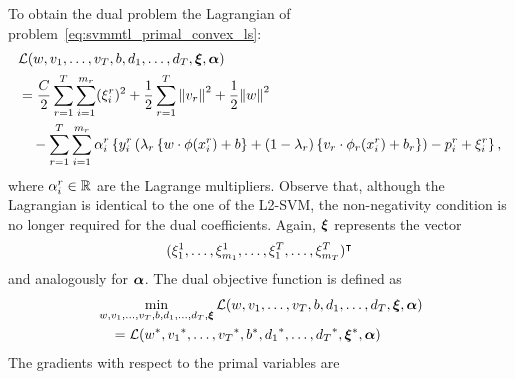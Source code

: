  To obtain the dual problem the Lagrangian of problem~\eqref{eq:svmmtl_primal_convex_ls}:
\begin{equation}\label{eq:svmmtl_lagrangian_convex_ls}
    \begin{aligned}
        & \lagr({w}, {v}_1, \ldots, {v}_\ntasks, b, d_1, \ldots, d_\ntasks, \fv{\xi}, \fv{\alpha}) \\
        &=  \frac{C}{2} \sum_{r= 1}^T \sum_{i=1}^{m_r} ({\xi_{i}^r})^2 + \frac{1}{2} \sum_{r= 1}^T{\norm{{v}_r}^2} + \frac{1}{2} {\norm{{w}}}^2 \\
        &\quad -  \sum_{r= 1}^T \sum_{i=1}^{m_r} \alpha_i^r \left\lbrace y_{i}^r  \left(\lambda_r \left\lbrace {w} \cdot \phi(x_{i}^r) + b  \right\rbrace + (1 - \lambda_r) \left\lbrace {v}_r \cdot \phi_r(x_{i}^r) + b_r \right\rbrace  \right) - p_{i}^r + \xi_{i}^r  \right\rbrace ,
    \end{aligned}
\end{equation}
where $\alpha_i^r \in \mathbb{R}$ are the Lagrange multipliers. Observe that, although the Lagrangian is identical to the one of the L2-SVM, the non-negativity condition is no longer required for the dual coefficients.  Again, $\bm{\xi}$ represents the vector $$(\xi_1^1, \ldots, \xi_{m_1}^1, \ldots, \xi_1^T, \ldots, \xi_{m_T}^T)^\intercal$$ and analogously for $\bm{\alpha}$. The dual objective function is defined as 
\begin{equation}\nonumber
    \begin{aligned}
          &  \min_{{w}, {v}_1, \ldots, {v}_T, b, d_1, \ldots, d_T, \bm{\xi}} \mathcal{L}({w}, {v}_1, \ldots, {v}_T, b, d_1, \ldots, d_T, \bm{\xi}, \bm{\alpha}) \\
         &\quad = \mathcal{L}({{w}}^*, {{v}_1}^*, \ldots, {{v}_T}^*, {b}^*, {d_1}^*, \ldots, {d_T}^*, {\bm{\xi}}^*, \bm{\alpha})
    \end{aligned}    
\end{equation}
The gradients with respect to the primal variables are
